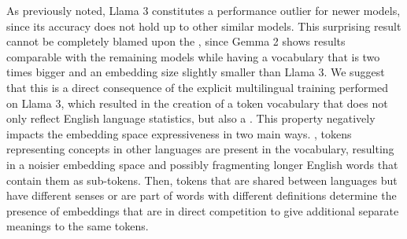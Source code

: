 As previously noted, Llama 3 constitutes a performance outlier for newer models, since its accuracy does not hold up to other similar models.
This surprising result cannot be completely blamed upon the , since Gemma 2 shows results comparable with the remaining models while having a vocabulary that is two times bigger and an embedding size slightly smaller than Llama 3.
We suggest that this is a direct consequence of the explicit multilingual training performed on Llama 3, which resulted in the creation of a token vocabulary that does not only reflect English language statistics, but also a .
This property negatively impacts the embedding space expressiveness in two main ways.
, tokens representing concepts in other languages are present in the vocabulary, resulting in a noisier embedding space and possibly fragmenting longer English words that contain them as sub-tokens.
Then, tokens that are shared between languages but have different senses or are part of words with different definitions determine the presence of embeddings that are in direct competition to give additional separate meanings to the same tokens.


